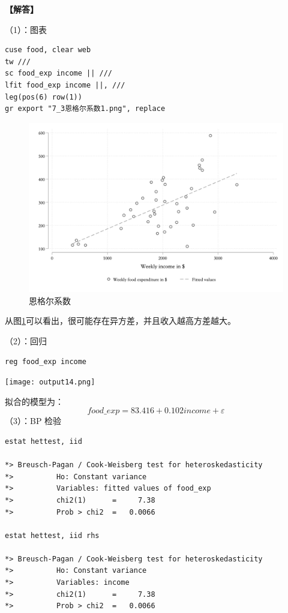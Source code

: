 \documentclass[cn,fancy,blue,11pt]{elegantbook}
\begin{document}
\textbf{【解答】}

（1）：图表

\begin{lstlisting}
cuse food, clear web
tw ///
sc food_exp income || ///
lfit food_exp income ||, ///
leg(pos(6) row(1))
gr export "7_3恩格尔系数1.png", replace
\end{lstlisting}

\begin{figure}

{\centering \includegraphics[width=0.9\linewidth]{assets/7_3恩格尔系数1}

}

\caption{恩格尔系数}\label{fig:pic73}
\end{figure}

从图\ref{fig:pic73}可以看出，很可能存在异方差，并且收入越高方差越大。

（2）：回归

\begin{lstlisting}
reg food_exp income
\end{lstlisting}

\noindent\texttt{[image: output14.png]}

拟合的模型为：
\begin{equation}
  food\_exp = 83.416 + 0.102income + \varepsilon
\end{equation}
（3）：BP 检验

\begin{lstlisting}
estat hettest, iid

*> Breusch-Pagan / Cook-Weisberg test for heteroskedasticity
*>          Ho: Constant variance
*>          Variables: fitted values of food_exp
*>          chi2(1)      =     7.38
*>          Prob > chi2  =   0.0066

estat hettest, iid rhs

*> Breusch-Pagan / Cook-Weisberg test for heteroskedasticity
*>          Ho: Constant variance
*>          Variables: income
*>          chi2(1)      =     7.38
*>          Prob > chi2  =   0.0066
\end{lstlisting}
\end{document}
